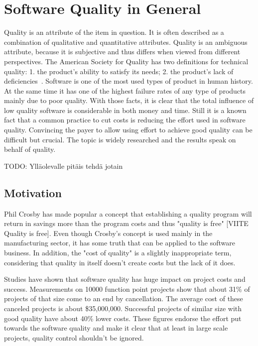 \section{Software Quality in General}

Quality is an attribute of the item in question. It is often described as a combination of qualitative and quantitative attributes. Quality is an ambiguous attribute, because it is subjective and thus differs when viewed from different perspectives. The American Society for Quality has two definitions for technical quality: 1. the product's ability to satisfy its needs; 2. the product's lack of deficiencies~\cite{ASQglossary}. Software is one of the most used types of product in human history. At the same time it has one of the highest failure rates of any type of products mainly due to poor quality. With those facts, it is clear that the total influence of low quality software is considerable in both money and time. Still it is a known fact that a common practice to cut costs is reducing the effort used in software quality. Convincing the payer to allow using effort to achieve good quality can be difficult but crucial. The topic is widely researched and the results speak on behalf of quality.

TODO: Ylläolevalle pitäis tehdä jotain 

\subsection{Motivation}

Phil Crosby has made popular a concept that establishing a quality program will return in savings more than the program costs and thus "quality is free" [VIITE Quality is free]. Even though Crosby's concept is used mainly in the manufacturing sector, it has some truth that can be applied to the software business.  In addition, the "cost of quality" is a slightly inappropriate term, considering that quality in itself doesn't create costs but the lack of it does. 

Studies have shown that software quality has huge impact on project costs and success. Measurements on 10000 function point projects show that about 31\% of projects of that size come to an end by cancellation. The average cost of these canceled projects is about \$35,000,000. Successful projects of similar size with good quality have about 40\% lower costs. These figures endorse the effort put towards the software quality and make it clear that at least in large scale projects, quality control shouldn't be ignored.


